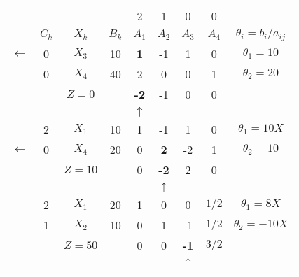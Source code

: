     \begin{tabular}{ccccccccc}
\cline{2-9}            &         &         &         & 2       & 1       & 0       & 0       &  \bigstrut[t]\\
            & $C_k$   & $X_k$   & $B_k$   & $A_1$   & $A_2$   & $A_3$   & $A_4$   & $\theta_i = b_i/a_{ij}$ \bigstrut[b]\\
\cline{2-9}    $\leftarrow$ & 0       & \textcolor[rgb]{ 1,  0,  0}{\boldmath{}\textbf{$X_3$}\unboldmath{}} & 10      & \textbf{1} & -1      & 1       & 0       & \boldmath{}\textbf{$\theta_1 = 10$}\unboldmath{} \bigstrut[t]\\
            & 0       & $X_4$   & 40      & 2       & 0       & 0       & 1       & $\theta_2 = 20$ \bigstrut[b]\\
\cline{2-9}            &         & $Z=0$   &         & \textcolor[rgb]{ 0,  .439,  .753}{\textbf{-2}} & -1      & 0       & 0       &  \bigstrut\\
\cline{2-9}            &         &         &         & $\uparrow$ &         &         &         &  \bigstrut\\
\cline{2-9}            & 2       & $X_1$   & 10      & 1       & -1      & 1       & 0       & $\theta_1 = 10X$ \bigstrut[t]\\
    $\leftarrow$ & 0       & \textcolor[rgb]{ 1,  0,  0}{\boldmath{}\textbf{$X_4$}\unboldmath{}} & 20      & 0       & \textbf{2} & -2      & 1       & \boldmath{}\textbf{$\theta_2 = 10$}\unboldmath{} \bigstrut[b]\\
\cline{2-9}            &         & $Z=10$  &         & 0       & \textcolor[rgb]{ 0,  .439,  .753}{\textbf{-2}} & 2       & 0       &  \bigstrut\\
\cline{2-9}            &         &         &         &         & $\uparrow$ &         &         &  \bigstrut\\
\cline{2-9}            & 2       & $X_1$   & 20      & 1       & 0       & 0       & $1/2$   & $\theta_1 = 8X$ \bigstrut[t]\\
            & 1       & $X_2$   & 10      & 0       & 1       & -1      & $1/2$   & $\theta_2 = -10X$ \bigstrut[b]\\
\cline{2-9}            &         & $Z=50$  &         & 0       & 0       & \textcolor[rgb]{ 0,  .439,  .753}{\textbf{-1}} & $3/2$   &  \bigstrut\\
\cline{2-9}            &         &         &         &         &         & $\uparrow$ &         &  \bigstrut[t]\\
    \end{tabular}%
